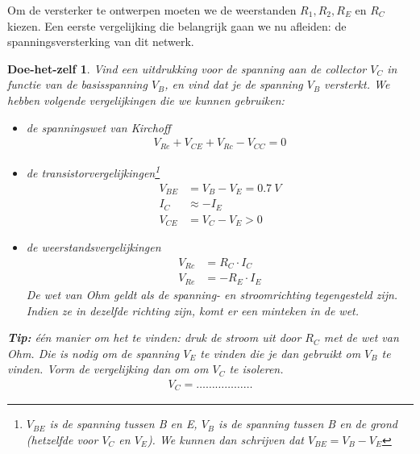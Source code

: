 \documentclass{article}
\newtheorem{DIY}{Doe-het-zelf}
\begin{document}

				Om de versterker te ontwerpen moeten we de weerstanden $R_1,R_2,R_E$ en $R_C$ kiezen. Een eerste vergelijking die belangrijk gaan we nu afleiden: de spanningsversterking van dit netwerk.

				\begin{DIY} Vind een uitdrukking voor de spanning aan de collector $V_C$ in functie van de basisspanning $V_B$, en vind dat je de spanning $V_B$ versterkt. We hebben volgende vergelijkingen die we kunnen gebruiken:
				\begin{itemize}
					\item de spanningswet van Kirchoff
					\begin{align}
					V_{Re} + V_{CE} + V_{Rc} - V_{CC} = 0    
					\end{align}
					\item de transistorvergelijkingen\footnote{ $V_{BE}$  is de spanning tussen B en E, $V_{B}$ is de spanning tussen B en de grond (hetzelfde voor $V_C$ en $V_E$). We kunnen dan schrijven dat $ V_{BE} = V_{B} - V_{E} $}
					\begin{align}
				    V_{BE} &= V_{B} - V_{E} = 0.7~V \\
				     I_C&\approx -I_E \\
				    V_{CE} &= V_C - V_E > 0
					\end{align}
					\item de weerstandsvergelijkingen
					\begin{align}
				   	V_{Rc} &= R_C \cdot I_C \\
				   	V_{Re} &= - R_E \cdot  I_E
					\end{align}
					De wet van Ohm geldt als de spanning- en stroomrichting tegengesteld zijn. Indien ze in dezelfde richting zijn, komt er een minteken in de wet.
				\end{itemize}

				\textbf{Tip:} \'e\'en manier om het te vinden: druk de stroom uit door $R_C$ met de wet van Ohm. Die is nodig om de spanning $V_E$ te vinden die je dan gebruikt om $V_B$ te vinden. Vorm de vergelijking dan om om $V_C$ te isoleren.
				\begin{align}
				    V_C = \ldots \ldots \ldots \ldots  \ldots  \ldots 
				\end{align}
				\end{DIY}
\end{document}
